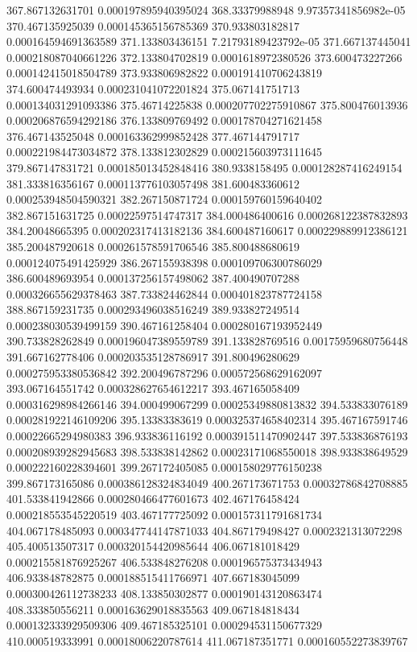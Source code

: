 {367.867132631701 0.000197895940395024
368.33379988948 9.97357341856982e-05
370.467135925039 0.000145365156785369
370.933803182817 0.000164594691363589
371.133803436151 7.21793189423792e-05
371.667137445041 0.000218087040661226
372.133804702819 0.0001618972380526
373.600473227266 0.000142415018504789
373.933806982822 0.000191410706243819
374.600474493934 0.000231041072201824
375.067141751713 0.000134031291093386
375.46714225838 0.000207702275910867
375.800476013936 0.000206876594292186
376.133809769492 0.000178704271621458
376.467143525048 0.000163362999852428
377.467144791717 0.000221984473034872
378.133812302829 0.000215603973111645
379.867147831721 0.000185013452848416
380.9338158495 0.000128287416249154
381.333816356167 0.000113776103057498
381.600483360612 0.000253948504590321
382.267150871724 0.000159760159640402
382.867151631725 0.00022597514747317
384.000486400616 0.000268122387832893
384.20048665395 0.000202317413182136
384.600487160617 0.000229889912386121
385.200487920618 0.000261578591706546
385.800488680619 0.000124075491425929
386.267155938398 0.000109706300786029
386.600489693954 0.000137256157498062
387.400490707288 0.000326655629378463
387.733824462844 0.000401823787724158
388.867159231735 0.000293496038516249
389.933827249514 0.000238030539499159
390.467161258404 0.000280167193952449
390.733828262849 0.000196047389559789
391.133828769516 0.00175959680756448
391.667162778406 0.000203535128786917
391.800496280629 0.000275953380536842
392.200496787296 0.000572568629162097
393.067164551742 0.000328627654612217
393.467165058409 0.000316298984266146
394.000499067299 0.00025349880813832
394.533833076189 0.000281922146109206
395.13383383619 0.000325374658402314
395.467167591746 0.00022665294980383
396.933836116192 0.000391511470902447
397.533836876193 0.000208939282945683
398.533838142862 0.00023171068550018
398.933838649529 0.000222160228394601
399.267172405085 0.000158029776150238
399.867173165086 0.000386128324834049
400.267173671753 0.00032786842708885
401.533841942866 0.000280466477601673
402.467176458424 0.000218553545220519
403.467177725092 0.000157311791681734
404.067178485093 0.000347744147871033
404.867179498427 0.0002321313072298
405.400513507317 0.000320154420985644
406.067181018429 0.000215581876925267
406.533848276208 0.000196575373434943
406.933848782875 0.000188515411766971
407.667183045099 0.000300426112738233
408.133850302877 0.000190143120863474
408.333850556211 0.000163629018835563
409.067184818434 0.000132333929509306
409.467185325101 0.000294531150677329
410.000519333991 0.00018006220787614
411.067187351771 0.000160552273839767
}
